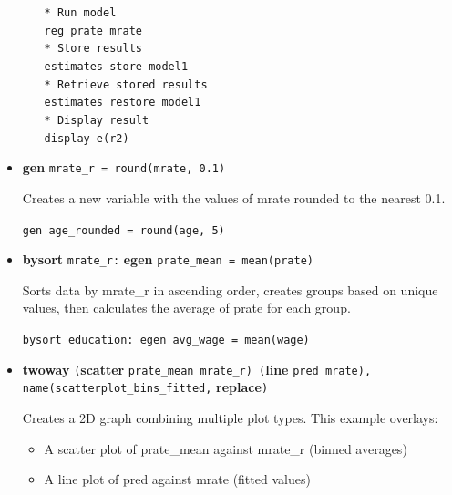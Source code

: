 \documentclass{article}
\begin{document}
\begin{itemize}[leftmargin=*,itemsep=8pt]
\begin{itemize}
         \begin{tcolorbox}[colback=lightgray!50,colframe=lightgray!20,boxrule=0.5pt]  
         \texttt{* Run model}\\  
         \texttt{reg prate mrate}\\  
         \texttt{* Store results}\\  
         \texttt{estimates store model1}\\  
         \texttt{* Retrieve stored results}\\  
         \texttt{estimates restore model1}\\  
         \texttt{* Display result}\\  
         \texttt{display e(r2)}  
         \end{tcolorbox}  
     \end{itemize}  
   
     \item \textcolor{statablue}{\textbf{gen}} \texttt{mrate\_r = round(mrate, 0.1)}   
       
     Creates a new variable with the values of mrate rounded to the nearest 0.1.  
       
     \begin{tcolorbox}[colback=lightgray!50,colframe=lightgray!20,boxrule=0.5pt]  
     \texttt{gen age\_rounded = round(age, 5)}  
     \end{tcolorbox}  
   
     \item \textcolor{statablue}{\textbf{bysort}} \texttt{mrate\_r:} \textcolor{statablue}{\textbf{egen}} \texttt{prate\_mean = mean(prate)}   
       
     Sorts data by mrate\_r in ascending order, creates groups based on unique values, then calculates the average of prate for each group.  
       
     \begin{tcolorbox}[colback=lightgray!50,colframe=lightgray!20,boxrule=0.5pt]  
     \texttt{bysort education: egen avg\_wage = mean(wage)}  
     \end{tcolorbox}  
   
     \item \textcolor{statablue}{\textbf{twoway}} \texttt{(}\textcolor{statablue}{\textbf{scatter}} \texttt{prate\_mean mrate\_r) (}\textcolor{statablue}{\textbf{line}} \texttt{pred mrate), name(scatterplot\_bins\_fitted,} \textcolor{statablue}{\textbf{replace}}\texttt{)}   
       
     Creates a 2D graph combining multiple plot types. This example overlays:  
     \begin{itemize}  
       \item A scatter plot of prate\_mean against mrate\_r (binned averages)  
       \item A line plot of pred against mrate (fitted values)  
     \end{itemize}  
       

\end{itemize}
\end{document}
